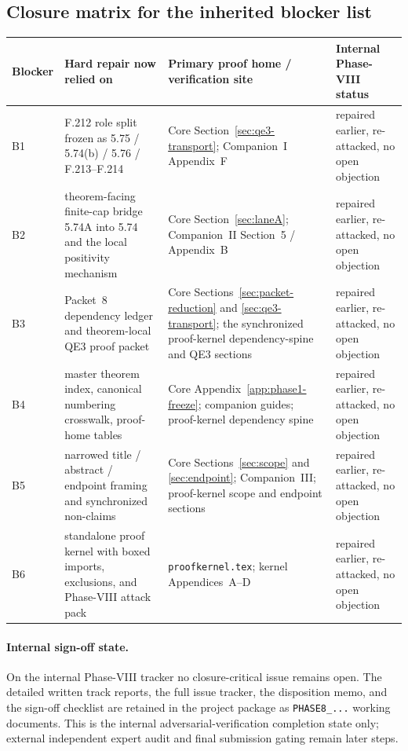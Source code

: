 \subsection*{Closure matrix for the inherited blocker list}
\begingroup
\scriptsize
\setlength{\tabcolsep}{4pt}
\renewcommand{\arraystretch}{1.08}
\noindent\begin{tabular}{@{}p{}p{}p{}p{}@{}}
\toprule
\textbf{Blocker} & \textbf{Hard repair now relied on} & \textbf{Primary proof home / verification site} & \textbf{Internal Phase-VIII status}\\
\midrule
B1 & F.212 role split frozen as 5.75 / 5.74(b) / 5.76 / F.213--F.214 & Core Section~\ref{sec:qe3-transport}; Companion~I Appendix~F & repaired earlier, re-attacked, no open objection\\[0.35em]
B2 & theorem-facing finite-cap bridge 5.74A into 5.74 and the local positivity mechanism & Core Section~\ref{sec:laneA}; Companion~II Section~5 / Appendix~B & repaired earlier, re-attacked, no open objection\\[0.35em]
B3 & Packet~8 dependency ledger and theorem-local QE3 proof packet & Core Sections~\ref{sec:packet-reduction} and \ref{sec:qe3-transport}; the synchronized proof-kernel dependency-spine and QE3 sections & repaired earlier, re-attacked, no open objection\\[0.35em]
B4 & master theorem index, canonical numbering crosswalk, proof-home tables & Core Appendix~\ref{app:phase1-freeze}; companion guides; proof-kernel dependency spine & repaired earlier, re-attacked, no open objection\\[0.35em]
B5 & narrowed title / abstract / endpoint framing and synchronized non-claims & Core Sections~\ref{sec:scope} and \ref{sec:endpoint}; Companion~III; proof-kernel scope and endpoint sections & repaired earlier, re-attacked, no open objection\\[0.35em]
B6 & standalone proof kernel with boxed imports, exclusions, and Phase-VIII attack pack & \texttt{proofkernel.tex}; kernel Appendices~A--D & repaired earlier, re-attacked, no open objection\\
\bottomrule
\end{tabular}
\endgroup

\paragraph{Internal sign-off state.}
On the internal Phase-VIII tracker no closure-critical issue remains open. The detailed written track reports, the full issue tracker, the disposition memo, and the sign-off checklist are retained in the project package as \texttt{PHASE8\_...} working documents. This is the internal adversarial-verification completion state only; external independent expert audit and final submission gating remain later steps.
